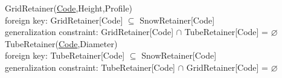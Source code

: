 {\color{ForestGreen}GridRetainer(\underline{Code},Height,Profile)}\\
{\color{Orange}\hspace{2mm} foreign key: {\color{Magenta}GridRetainer[Code] $\subseteq$ SnowRetainer[Code]}} \\
{\color{Orange}\hspace{2mm} generalization constraint: {\color{Magenta} GridRetainer[Code] $\cap $ TubeRetainer[Code] = $\varnothing$ }} \\

{\color{ForestGreen}TubeRetainer(\underline{Code},Diameter)}\\
{\color{Orange}\hspace{2mm} foreign key: {\color{Magenta}TubeRetainer[Code] $\subseteq$ SnowRetainer[Code]}} \\
{\color{Orange}\hspace{2mm} generalization constraint: {\color{Magenta} TubeRetainer[Code]  $\cap $ GridRetainer[Code]  = $\varnothing$ }} \\

